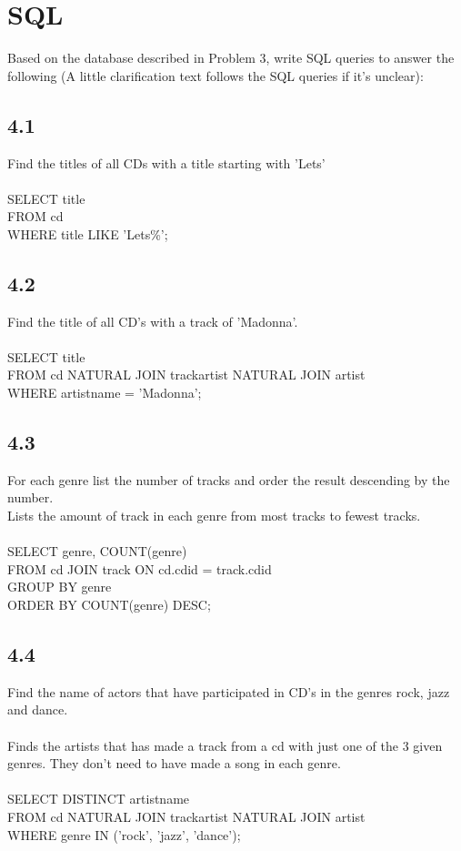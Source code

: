 \documentclass[12pt]{article}
\begin{document}
\section*{SQL}
Based on the database described in Problem 3, write SQL queries to answer the following (A little clarification text follows the SQL queries if it's unclear):
\subsection*{4.1}
Find the titles of all CDs with a title starting with 'Lets'\\
\\
SELECT title\\
FROM cd\\
WHERE title LIKE 'Lets\%';

\subsection*{4.2}
Find the title of all CD’s with a track of 'Madonna'.\\
\\
SELECT title\\
FROM cd NATURAL JOIN trackartist NATURAL JOIN artist\\
WHERE artistname = 'Madonna';

\subsection*{4.3}
For each genre list the number of tracks and order the result descending by the number.\\
Lists the amount of track in each genre from most tracks to fewest tracks.\\
\\
SELECT genre, COUNT(genre)\\
FROM cd JOIN track ON cd.cdid = track.cdid\\
GROUP BY genre\\
ORDER BY COUNT(genre) DESC;

\subsection*{4.4}
Find the name of actors that have participated in CD’s in the genres rock, jazz and dance.\\
\\
Finds the artists that has made a track from a cd with just one of the 3 given genres. They don't need to have made a song in each genre.\\
\\
SELECT DISTINCT artistname\\
FROM cd NATURAL JOIN trackartist NATURAL JOIN artist\\
WHERE genre IN ('rock', 'jazz', 'dance');
\end{document}
